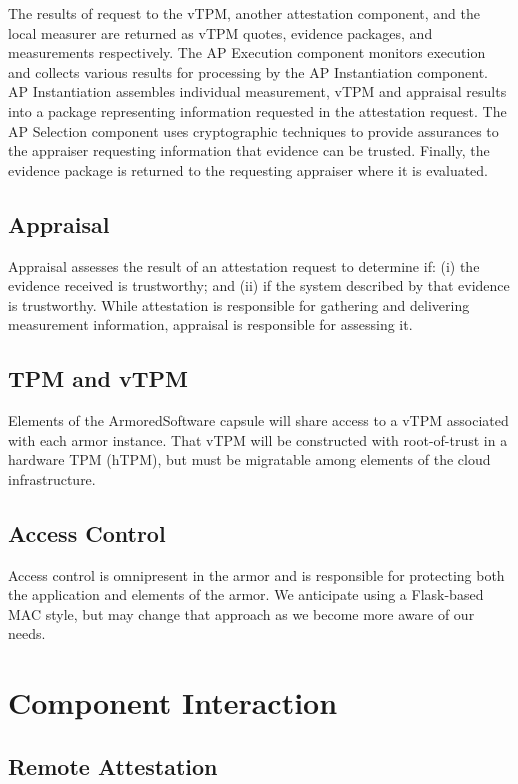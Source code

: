 \documentclass[10pt]{article}
\begin{document}
The results of request to the vTPM, another attestation component, and
the local measurer are returned as vTPM quotes, evidence packages, and
measurements respectively.  The AP Execution component monitors
execution and collects various results for processing by the AP
Instantiation component.  AP Instantiation assembles individual
measurement, vTPM and appraisal results into a package representing
information requested in the attestation request.  The AP Selection
component uses cryptographic techniques to provide assurances to the
appraiser requesting information that evidence can be trusted.
Finally, the evidence package is returned to the requesting appraiser
where it is evaluated.

\subsection{Appraisal}

Appraisal assesses the result of an attestation request to determine
if: (i) the evidence received is trustworthy; and (ii) if the
system described by that evidence is trustworthy.  While attestation
is responsible for gathering and delivering measurement information,
appraisal is responsible for assessing it.

\subsection{TPM and vTPM}

Elements of the ArmoredSoftware capsule will share access to a vTPM
associated with each armor instance.  That vTPM will be constructed with
root-of-trust in a hardware TPM (hTPM), but must be migratable among
elements of the cloud infrastructure.

\subsection{Access Control}

Access control is omnipresent in the armor and is responsible for
protecting both the application and elements of the armor.  We
anticipate using a Flask-based MAC style, but may change that approach
as we become more aware of our needs.

\section{Component Interaction}

\subsection{Remote Attestation}
\end{document}
